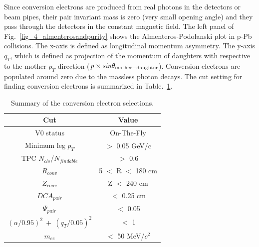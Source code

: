 {{Since conversion electrons are produced from real photons in the detectors or beam pipes, their pair invariant mass is zero (very small opening angle) and they pass through the detectors in the constant magnetic field.  
The left panel of Fig.~\ref{fig_4_almenterosandpurity} shows the Almenteros-Podolanski plot in p-Pb collisions.
The x-axis is defined as longitudinal momentum asymmetry. 
The y-axis $q_{T}$, which is defined as projection of the momentum of daughters with respective to the mother $p_{T}$ direction ($\it{p}\times sin\theta_{\rm{mother-daughter}}$). 
Conversion electrons are populated around zero due to the massless photon decays.  
The cut setting for finding conversion electrons is summarized in Table.~\ref{table_convcut}.
\begin{table}[!h]
  \centering
  \begin{tabular}{cc} \hline
    Cut  & Value \\ \hline
    V0 status  & On-The-Fly \\ 
    Minimum leg $p_{T}$  & $>$ 0.05 GeV/c \\ 
    TPC $N_{cls}$/$N_{findable}$ & $>$ 0.6 \\ 
    $R_{conv}$  & 5 $<$ R $<$ 180 cm \\
    $Z_{conv}$  & Z $<$ 240 cm \\ 
    $DCA_{pair}$  & $<$ 0.25 cm\\ 
    $\Psi_{pair}$  & $<$ 0.05 \\ 
    $(\alpha/0.95)^{2}~+~(q_{T}/0.05)^{2}$  & $<$ 1 \\ 
    $m_{ee}$  & $<$ 50 MeV/$c^{2}$ \\ \hline
  \end{tabular}  
  \label{table_convcut}
  \caption{Summary of the conversion electron selections. }
\end{table}

}}
